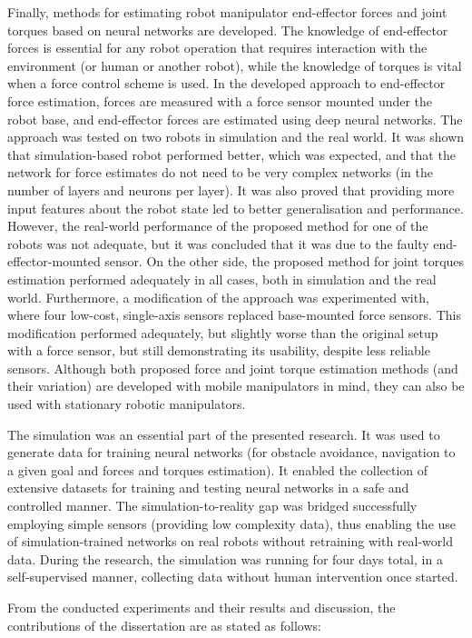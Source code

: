 Finally, methods for estimating robot manipulator end-effector forces and joint torques based on neural networks are developed. The knowledge of end-effector forces is essential for any robot operation that requires interaction with the environment (or human or another robot), while the knowledge of torques is vital when a force control scheme is used. In the developed approach to end-effector force estimation, forces are measured with a force sensor mounted under the robot base, and end-effector forces are estimated using deep neural networks. The approach was tested on two robots in simulation and the real world. It was shown that simulation-based robot performed better, which was expected, and that the network for force estimates do not need to be very complex networks (in the number of layers and neurons per layer). It was also proved that providing more input features about the robot state led to better generalisation and performance. However, the real-world performance of the proposed method for one of the robots was not adequate, but it was concluded that it was due to the faulty end-effector-mounted sensor. On the other side, the proposed method for joint torques estimation performed adequately in all cases, both in simulation and the real world. Furthermore, a modification of the approach was experimented with, where four low-cost, single-axis sensors replaced base-mounted force sensors. This modification performed adequately, but slightly worse than the original setup with a force sensor, but still demonstrating its usability, despite less reliable sensors. Although both proposed force and joint torque estimation methods (and their variation) are developed with mobile manipulators in mind, they can also be used with stationary robotic manipulators.

The simulation was an essential part of the presented research. It was used to generate data for training neural networks (for obstacle avoidance, navigation to a given goal and forces and torques estimation). It enabled the collection of extensive datasets for training and testing neural networks in a safe and controlled manner. The simulation-to-reality gap was bridged successfully employing simple sensors (providing low complexity data),  thus enabling the use of simulation-trained networks on real robots without retraining with real-world data. During the research, the simulation was running for four days total, in a self-supervised manner, collecting data without human intervention once started.

From the conducted experiments and their results and discussion, the contributions of the dissertation are as stated as follows:

